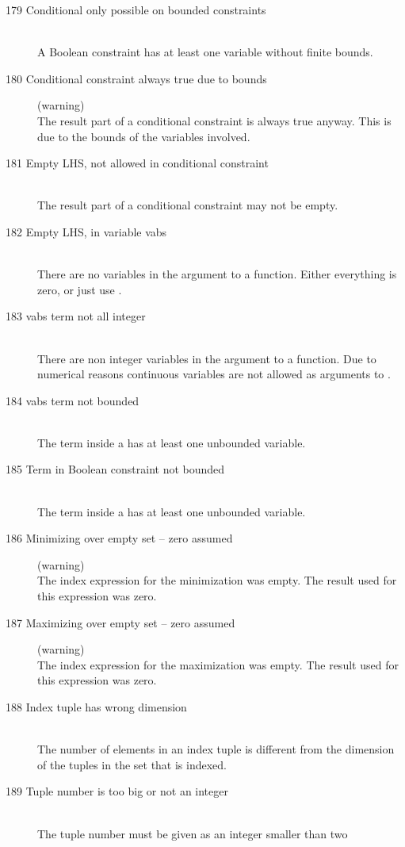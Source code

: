 \begin{description}
\item[179 Conditional only possible on bounded constraints]\ \\
   A Boolean constraint has at least one variable without finite bounds.
\item[180 Conditional constraint always true due to bounds] (warning)\ \\
   The result part of a conditional constraint is always true anyway. 
   This is due to the bounds of the variables involved.
\item[181 Empty LHS, not allowed in conditional constraint]\ \\
   The result part of a conditional constraint may not be empty.
\item[182 Empty LHS, in variable vabs]\ \\
   There are no variables in the argument to a  function.
   Either everything is zero, or just use .
\item[183 vabs term not all integer]\ \\
   There are non integer variables in the argument to a  function.
   Due to numerical reasons continuous variables are not allowed as
   arguments to . 
\item[184 vabs term not bounded]\ \\
   The term inside a  has at least one unbounded variable.
\item[185 Term in Boolean constraint not bounded]\ \\
   The term inside a  has at least one unbounded variable.
%
%
\item[186 Minimizing over empty set -- zero assumed] (warning)\ \\
   The index expression for the minimization was empty. The result
   used for this expression was zero.
\item[187 Maximizing over empty set -- zero assumed] (warning)\ \\
   The index expression for the maximization was empty. The result
   used for this expression was zero.
\item[188 Index tuple has wrong dimension]\ \\
   The number of elements in an index tuple is different from the
   dimension of the tuples in the set that is indexed.
\item[189 Tuple number  is too big or not an integer]\ \\
  The tuple number must be given as an integer smaller than two

\end{description}
